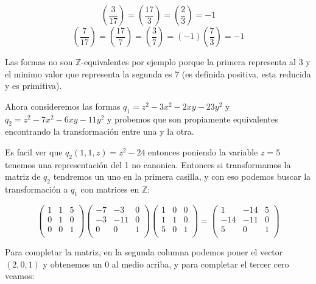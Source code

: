 \documentclass[12pt]{amsart}
\newcommand{\ZZ}{\mathbb{Z}}
\newcommand{\leg}[2]{\left( \frac{#1}{#2} \right)}
\newcommand{\lp}{\left(}
\newcommand{\rp}{\right)}
\theoremstyle{plain}
\begin{document}
$$\leg{3}{17} = \leg{17}{3} = \leg{2}{3} =-1$$
$$\leg{7}{17} = \leg{17}{7} = \leg{3}{7} = (-1)\leg{7}{3} 
= -1$$

Las formas no son $\ZZ$-equivalentes por ejemplo porque la 
primera representa al 3 y el minimo valor que representa la 
segunda es 7 (es definida positiva, esta reducida y es 
primitiva).

Ahora consideremos las formas $q_1=z^2-3x^2-2xy-23y^2$ y 
$q_2=z^2-7x^2-6xy-11y^2$ y probemos que son propiamente 
equivalentes encontrando la transformación entre una y la 
otra.

Es facil ver que $q_2(1,1,z)=z^2-24$ entonces poniendo la 
variable $z=5$ tenemos una representación del 1 no canonica.
Entonces si transformamos la matriz de $q_2$ tendremos un 
uno en la primera casilla, y con eso podemos buscar la 
transformación a $q_1$ con matrices en $\ZZ$:

$$\lp\begin{matrix}
    1&1&5 \\
    0&1&0 \\
    0&0&1 \\
\end{matrix}\rp
\lp\begin{matrix}
    -7&-3&0 \\
    -3&-11&0 \\
    0&0&1 \\
\end{matrix}\rp
\lp\begin{matrix}
    1&0&0 \\
    1&1&0 \\
    5&0&1 \\
\end{matrix}\rp = 
\lp\begin{matrix}
    1&-14&5 \\
    -14&-11&0 \\
    5&0&1 \\
\end{matrix}\rp$$

Para completar la matriz, en la segunda columna podemos 
poner el vector $(2,0,1)$ y obtenemos un 0 al medio arriba, 
y para completar el tercer cero veamos:
\end{document}
